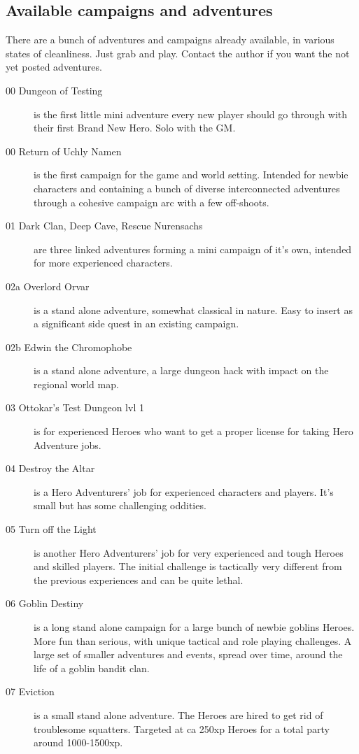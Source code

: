 \subsection*{Available campaigns and adventures}
There are a bunch of adventures and campaigns already available, in various states of cleanliness. Just grab and play. Contact the author if you want the not yet posted adventures.
\begin{description}
    \item[00 Dungeon of Testing] is the first little mini adventure every new player should go through with their first Brand New Hero. Solo with the GM.
    \item[00 Return of Uchly Namen] is the first campaign for the game and world setting. Intended for newbie characters and containing a bunch of diverse interconnected adventures through a cohesive campaign arc with a few off-shoots.
    \item[01 Dark Clan, Deep Cave, Rescue Nurensachs] are three linked adventures forming a mini campaign of it's own, intended for more experienced characters.
    \item[02a Overlord Orvar] is a stand alone adventure, somewhat classical in nature. Easy to insert as a significant side quest in an existing campaign.
    \item[02b Edwin the Chromophobe] is a stand alone adventure, a large dungeon hack with impact on the regional world map.
    \item[03 Ottokar's Test Dungeon lvl 1] is for experienced Heroes who want to get a proper license for taking Hero Adventure jobs.
    \item[04 Destroy the Altar] is a Hero Adventurers' job for experienced characters and players. It's small but has some challenging oddities.
    \item[05 Turn off the Light] is another Hero Adventurers' job for very experienced and tough Heroes and skilled players. The initial challenge is tactically very different from the previous experiences and can be quite lethal.
    \item[06 Goblin Destiny] is a long stand alone campaign for a large bunch of newbie goblins Heroes. More fun than serious, with unique tactical and role playing challenges. A large set of smaller adventures and events, spread over time, around the life of a goblin bandit clan.
    \item[07 Eviction] is a small stand alone adventure. The Heroes are hired to get rid of troublesome squatters. Targeted at ca 250xp Heroes for a total party around 1000-1500xp.
\end{description}


